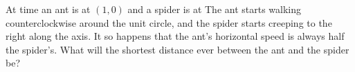 At time  an ant is at $(1,0)$ and a spider is at   The ant starts walking counterclockwise around the unit circle, and the spider starts creeping to the right along the axis.  It so happens that the ant's horizontal speed is always half the spider's.  What will the shortest distance ever between the ant and the spider be?